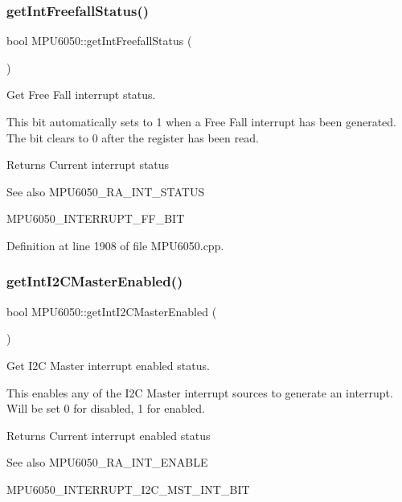 \subsubsection{\texorpdfstring{getIntFreefallStatus()}{getIntFreefallStatus()}}
{\footnotesize\ttfamily bool M\+P\+U6050\+::get\+Int\+Freefall\+Status (\begin{DoxyParamCaption}{ }\end{DoxyParamCaption})}



Get Free Fall interrupt status. 

This bit automatically sets to 1 when a Free Fall interrupt has been generated. The bit clears to 0 after the register has been read. \begin{DoxyReturn}{Returns}
Current interrupt status 
\end{DoxyReturn}
\begin{DoxySeeAlso}{See also}
M\+P\+U6050\+\_\+\+R\+A\+\_\+\+I\+N\+T\+\_\+\+S\+T\+A\+T\+US 

M\+P\+U6050\+\_\+\+I\+N\+T\+E\+R\+R\+U\+P\+T\+\_\+\+F\+F\+\_\+\+B\+IT 
\end{DoxySeeAlso}


Definition at line 1908 of file M\+P\+U6050.\+cpp.

\mbox{\label{classMPU6050_a282ae29e029d88604a59c92bdf9ce252}} 
\subsubsection{\texorpdfstring{getIntI2CMasterEnabled()}{getIntI2CMasterEnabled()}}
{\footnotesize\ttfamily bool M\+P\+U6050\+::get\+Int\+I2\+C\+Master\+Enabled (\begin{DoxyParamCaption}{ }\end{DoxyParamCaption})}



Get I2C Master interrupt enabled status. 

This enables any of the I2C Master interrupt sources to generate an interrupt. Will be set 0 for disabled, 1 for enabled. \begin{DoxyReturn}{Returns}
Current interrupt enabled status 
\end{DoxyReturn}
\begin{DoxySeeAlso}{See also}
M\+P\+U6050\+\_\+\+R\+A\+\_\+\+I\+N\+T\+\_\+\+E\+N\+A\+B\+LE 

M\+P\+U6050\+\_\+\+I\+N\+T\+E\+R\+R\+U\+P\+T\+\_\+\+I2\+C\+\_\+\+M\+S\+T\+\_\+\+I\+N\+T\+\_\+\+B\+IT 
\end{DoxySeeAlso}


